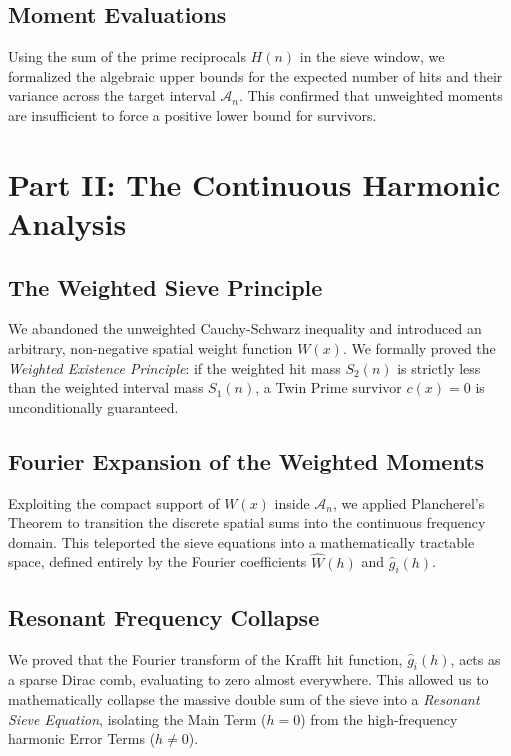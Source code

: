 \documentclass[12pt]{article}
\begin{document}
\subsection{Moment Evaluations}

Using the sum of the prime reciprocals $H(n)$ in the sieve window, we formalized the algebraic
upper bounds for the expected number of hits and their variance across the target interval $\mathcal{A}_n$.
This confirmed that unweighted moments are insufficient to force a positive lower bound for survivors.

\section{Part II: The Continuous Harmonic Analysis}

\subsection{The Weighted Sieve Principle}

We abandoned the unweighted Cauchy-Schwarz inequality and introduced an arbitrary, non-negative
spatial weight function $W(x)$. We formally proved the \textit{Weighted Existence Principle}: if the
weighted hit mass $S_2(n)$ is strictly less than the weighted interval mass $S_1(n)$, a Twin Prime
survivor $c(x)=0$ is unconditionally guaranteed.

\subsection{Fourier Expansion of the Weighted Moments}

Exploiting the compact support of $W(x)$ inside $\mathcal{A}_n$, we applied Plancherel's Theorem to
transition the discrete spatial sums into the continuous frequency domain. This teleported the sieve
equations into a mathematically tractable space, defined entirely by the Fourier coefficients
$\hat{W}(h)$ and $\hat{g}_i(h)$.

\subsection{Resonant Frequency Collapse}

We proved that the Fourier transform of the Krafft hit function, $\hat{g}_i(h)$, acts as a sparse
Dirac comb, evaluating to zero almost everywhere. This allowed us to mathematically collapse the
massive double sum of the sieve into a \textit{Resonant Sieve Equation}, isolating the Main Term
($h=0$) from the high-frequency harmonic Error Terms ($h \neq 0$).
\end{document}
